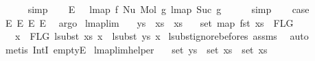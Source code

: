 \begin{isabellebody}
\ \ \ \ \isamarkupfalse%
\ simp\isanewline
\ \ \isamarkupfalse%
\ E{}{\isacharcolon}{\kern0pt}\ {\isachardoublequoteopen}{\isachardot}{\kern0pt}{\isachardot}{\kern0pt}{\isachardot}{\kern0pt}\ {\isacharequal}{\kern0pt}\ lmap\ f\ {\isacharparenleft}{\kern0pt}Nu\ {\isacharparenleft}{\kern0pt}Mol\ g{}\ {\isacharparenleft}{\kern0pt}lmap\ Suc\ g{}{\isacharparenright}{\kern0pt}{\isacharparenright}{\kern0pt}{\isacharparenright}{\kern0pt}{\isachardoublequoteclose}\isanewline
\ \ \ \ \isamarkupfalse%
\ simp\isanewline
\isanewline
\ \ \isamarkupfalse%
\ {\isacharquery}{\kern0pt}case\isanewline
\ \ \ \ \isamarkupfalse%
\ E{}\ E{}\ E{}\ E{}\ \isamarkupfalse%
\ argo\isanewline
{}\isamarkupfalse%
%
\endisatagproof
{\isafoldproof}%
%
\isadelimproof
\isanewline
%
\endisadelimproof
\isanewline
\isanewline
\isanewline
\isanewline
\isanewline
\isanewline
{}\isamarkupfalse%
\ lmap{\isacharunderscore}{\kern0pt}lim{}{\isacharcolon}{\kern0pt}\isanewline
\ \ \ {\isachardoublequoteopen}ys\ {\isacharequal}{\kern0pt}\ xs{}\ {\isacharat}{\kern0pt}\ xs{}{\isachardoublequoteclose}\isanewline
\ \ \ {\isachardoublequoteopen}set\ {\isacharparenleft}{\kern0pt}map\ fst\ xs{}{\isacharparenright}{\kern0pt}\ {\isasyminter}\ FLG\ {\isacharequal}{\kern0pt}\ {\isacharbraceleft}{\kern0pt}{\isacharbraceright}{\kern0pt}{\isachardoublequoteclose}\isanewline
\ \ \ {\isachardoublequoteopen}{\isasymforall}x\ {\isasymin}\ FLG{\isachardot}{\kern0pt}\ lsubst\ xs{}\ x\ {\isacharequal}{\kern0pt}\ lsubst\ ys\ x{\isachardoublequoteclose}\isanewline
%
\isadelimproof
%
\endisadelimproof
%
\isatagproof
{}\isamarkupfalse%
\ lsubst{\isacharunderscore}{\kern0pt}ignore{\isacharunderscore}{\kern0pt}befores\ assms\ \isamarkupfalse%
\ auto\isanewline
{}\isamarkupfalse%
\ {\isacharparenleft}{\kern0pt}metis\ IntI\ emptyE{\isacharparenright}{\kern0pt}%
\endisatagproof
{\isafoldproof}%
%
\isadelimproof
\isanewline
%
\endisadelimproof
\isanewline
\isanewline
{}\isamarkupfalse%
\ lmap{\isacharunderscore}{\kern0pt}lim{\isacharunderscore}{\kern0pt}helper{\isacharcolon}{\kern0pt}\isanewline
\ \ \ {\isachardoublequoteopen}set\ ys\ {\isacharequal}{\kern0pt}\ set\ xs{}\ {\isasymunion}\ set\ xs{}{\isachardoublequoteclose}\isanewline

\end{isabellebody}
